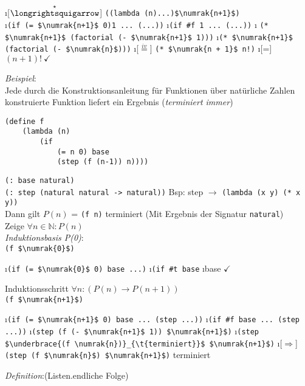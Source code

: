 \begin{enumerate}[\eval]
\i[$\overset{\star}{\text{\eval}}$] \lstinline[mathescape]|((lambda (n)...)$\numrak{n+1}$)|\\
\i \lstinline[mathescape]|(if (= $\numrak{n+1}$ 0)1 ... (...))|
\i \lstinline[]|(if #f|\lstinline| 1 ... (...))|
\i\marginpar{\textcolor{red}{Unter der Annahme, dass tatsächlich Subtraktion implementiert ist}} \lstinline[mathescape]|(* $\numrak{n+1}$ (factorial (- $\numrak{n+1}$ 1)))|
\i \lstinline[mathescape]|(* $\numrak{n+1}$ (factorial (- $\numrak{n}$)))|
\i[$\overset{iv}{=}$] \lstinline[mathescape]|(* $\numrak{n + 1}$ n!)|
\i[=]$(n+1)!\ \checkmark$
\end{enumerate}
\emph{Beispiel}:\\
Jede durch die Konstruktionsanleitung für Funktionen über natürliche Zahlen konstruierte Funktion liefert ein Ergebnis ({\em terminiert immer})\\
\begin{lstlisting}
(define f
	(lambda (n)
		(if
			(= n 0) base
			(step (f (n-1)) n))))
\end{lstlisting}
\lstinline|(: base natural)|\\
\lstinline|(: step (natural natural -> natural))|
Bsp: step $\rightarrow$ \lstinline|(lambda (x y) (* x y))|\\
Dann gilt $P(n)$ = \lstinline!(f n)! terminiert (Mit Ergebnis der Signatur \lstinline!natural!)\\
Zeige $\forall n \in \mathbb{N} : P(n)$\\
\emph{Induktionsbasis P(0)}:\\
\lstinline[mathescape]|(f $\numrak{0}$)|
\begin{enumerate}[\eval]
\i \lstinline[mathescape]|(if (= $\numrak{0}$ 0) base ...)|
\i \lstinline[]|(if #t base|
\i base $\checkmark $
\end{enumerate}
Induktionsschritt $\forall n : (P(n) \rightarrow P(n+1))$\\
\lstinline[mathescape]|(f $\numrak{n+1}$)|
\begin{enumerate}[\eval]
	\i \lstinline[mathescape]|(if (= $\numrak{n+1}$ 0) base ... (step ...))|
	\i \lstinline[]|(if #f|\lstinline| base ... (step ...))|
	\i \lstinline[mathescape]|(step (f (- $\numrak{n+1}$ 1)) $\numrak{n+1}$)|
	\i \lstinline[mathescape]|(step $\underbrace{(f \numrak{n})}_{\t{terminiert}}$ $\numrak{n+1}$)|
	\i[$\Rightarrow$]\lstinline[mathescape]!(step (f $\numrak{n}$) $\numrak{n+1}$)! terminiert
\end{enumerate}
\emph{Definition}:(Listen.endliche Folge)\\
